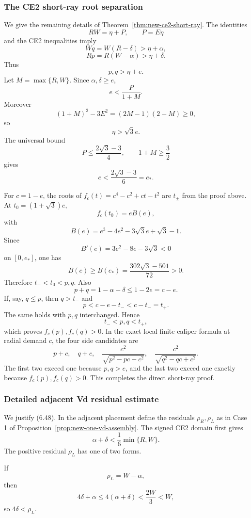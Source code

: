 \subsubsection{The CE2 short-ray root separation}
\label{subsec:calc-short-ray}

We give the remaining details of Theorem~\ref{thm:new-ce2-short-ray}.  The
identities
\[
 RW=\eta+P,
 \qquad P=E\eta
\]
and the CE2 inequalities imply
\[
 Wq=W(R-\delta)>\eta+\alpha,
\]
\[
 Rp=R(W-\alpha)>\eta+\delta.
\]
Thus
\[
 p,q>\eta+e.
 \tag{6.60}
\]
Let $M=\max\{R,W\}$.  Since $\alpha,\delta\ge e$,
\[
 e<\frac{P}{1+M}.
\]
Moreover
\[
 (1+M)^2-3E^2=(2M-1)(2-M)\ge0,
\]
so
\[
 \eta>\sqrt3e.
 \tag{6.61}
\]
The universal bound
\[
 P\le\frac{2\sqrt3-3}{4},
 \qquad 1+M\ge\frac32
\]
gives
\[
 e<\frac{2\sqrt3-3}{6}=e_*.
\]

For $c=1-e$, the roots of
$f_c(t)=c^4-c^2+ct-t^2$ are $t_\pm$ from the proof above.  At
$t_0=(1+\sqrt3)e$,
\[
 f_c(t_0)=eB(e),
\]
with
\[
 B(e)=e^3-4e^2-3\sqrt3e+\sqrt3-1.
\]
Since
\[
 B'(e)=3e^2-8e-3\sqrt3<0
\]
on $[0,e_*]$, one has
\[
 B(e)\ge B(e_*)=\frac{302\sqrt3-501}{72}>0.
\]
Therefore $t_-<t_0<p,q$.  Also
\[
 p+q=1-\alpha-\delta\le1-2e=c-e.
\]
If, say, $q\le p$, then $q>t_-$ and
\[
 p<c-e-t_-<c-t_-=t_+.
\]
The same holds with $p,q$ interchanged.  Hence
\[
 t_-<p,q<t_+,
\]
which proves $f_c(p),f_c(q)>0$.  In the exact local finite-caliper formula at
radial demand $c$, the four side candidates are
\[
 p+c,
 \quad q+c,
 \quad\frac{c^2}{\sqrt{p^2-pc+c^2}},
 \quad\frac{c^2}{\sqrt{q^2-qc+c^2}}.
\]
The first two exceed one because $p,q>e$, and the last two exceed one exactly
because $f_c(p),f_c(q)>0$.  This completes the direct short-ray proof.

\subsubsection{Detailed adjacent Vd residual estimate}
\label{subsec:calc-adjacent-vd}

We justify (6.48).  In the adjacent placement define the residuals
$\rho_R,\rho_L$ as in Case 1 of Proposition~\ref{prop:new-one-vd-assembly}.
The signed CE2 domain first gives
\[
 \alpha+\delta<\frac16\min\{R,W\}.
 \tag{6.62}
\]
The positive residual $\rho_L$ has one of two forms.

If
\[
 \rho_L=W-\alpha,
\]
then
\[
 4\delta+\alpha
 \le4(\alpha+\delta)
 <\frac{2W}{3}<W,
\]
so $4\delta<\rho_L$.

